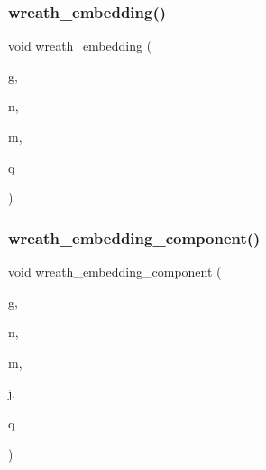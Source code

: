 \mbox{\label{perm__group__gens_8_c_aa29d82e7082af21ca98bbd658b809bce}} 
\subsubsection{\texorpdfstring{wreath\+\_\+embedding()}{wreath\_embedding()}}
{\footnotesize\ttfamily void wreath\+\_\+embedding (\begin{DoxyParamCaption}\item[{\mbox{\hyperlink{classpermutation}{permutation}} \&}]{g,  }\item[{\mbox{\hyperlink{galois_8h_a09fddde158a3a20bd2dcadb609de11dc}{I\+NT}}}]{n,  }\item[{\mbox{\hyperlink{galois_8h_a09fddde158a3a20bd2dcadb609de11dc}{I\+NT}}}]{m,  }\item[{\mbox{\hyperlink{classpermutation}{permutation}} \&}]{q }\end{DoxyParamCaption})}

\mbox{\label{perm__group__gens_8_c_a42c6a1b7d30f5f22238fb4676b165162}} 
\subsubsection{\texorpdfstring{wreath\+\_\+embedding\+\_\+component()}{wreath\_embedding\_component()}}
{\footnotesize\ttfamily void wreath\+\_\+embedding\+\_\+component (\begin{DoxyParamCaption}\item[{\mbox{\hyperlink{classpermutation}{permutation}} \&}]{g,  }\item[{\mbox{\hyperlink{galois_8h_a09fddde158a3a20bd2dcadb609de11dc}{I\+NT}}}]{n,  }\item[{\mbox{\hyperlink{galois_8h_a09fddde158a3a20bd2dcadb609de11dc}{I\+NT}}}]{m,  }\item[{\mbox{\hyperlink{galois_8h_a09fddde158a3a20bd2dcadb609de11dc}{I\+NT}}}]{j,  }\item[{\mbox{\hyperlink{classpermutation}{permutation}} \&}]{q }\end{DoxyParamCaption})}

